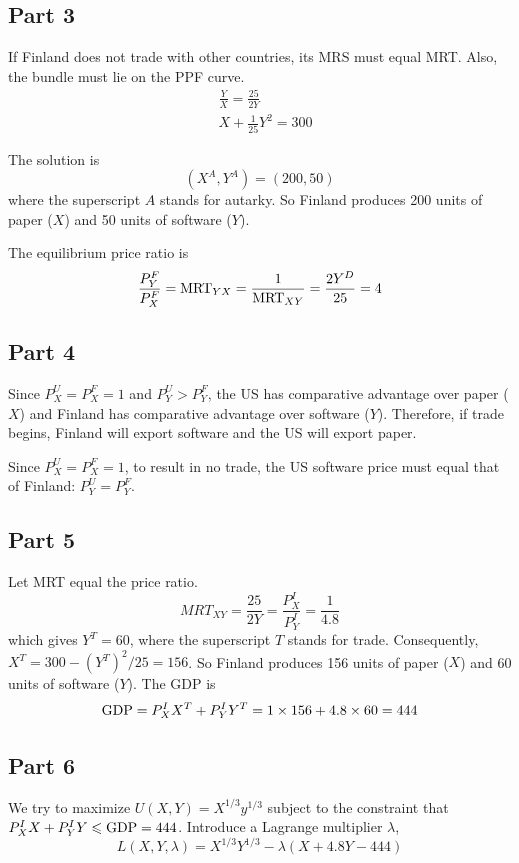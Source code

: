 \documentclass{article}
\begin{document}
\subsection{Part 3}
If Finland does not trade with other countries, its MRS must equal MRT. Also, the bundle must lie on the PPF curve.
\begin{align*}
&\frac{Y}{X}=\frac{25}{2Y}\\
&X+\frac{1}{25}Y^2=300
\end{align*}

The solution is
\begin{equation*}
(X^A,Y^A)=(200,50)
\end{equation*}
where the superscript $A$ stands for autarky. So Finland produces 200 units of paper ($X$) and 50 units of software ($Y$).

The equilibrium price ratio is
\begin{equation*}
\frac{P^F_Y}{P^F_X}=\textup{MRT}_{YX}=\frac{1}{\textup{MRT}_{XY}}=\frac{2Y^D}{25}=4
\end{equation*}

\subsection{Part 4}
Since $P^U_X=P^F_X=1$ and $P^U_Y>P^F_Y$, the US has comparative advantage over paper ($X$) and Finland has comparative advantage over software ($Y$). Therefore, if trade begins, Finland will export software and the US will export paper.

Since $P^U_X=P^F_X=1$, to result in no trade, the US software price must equal that of Finland: $P^U_Y=P^F_Y$.

\subsection{Part 5}
Let MRT equal the price ratio.
\begin{equation*}
MRT_{XY}=\frac{25}{2Y}=\frac{P_X^I}{P_Y^I}=\frac{1}{4.8}
\end{equation*}
which gives $Y^T=60$, where the superscript $T$ stands for trade. Consequently, $X^T=300-(Y^T)^2/25=156$. So Finland produces 156 units of paper ($X$) and 60 units of software ($Y$). The GDP is
\begin{equation*}
\textup{GDP}=P_X^IX^T+P_Y^IY^T=1\times 156+4.8\times 60=444
\end{equation*}

\subsection{Part 6}
We try to maximize $U(X,Y)=X^{1/3}y^{1/3}$ subject to the constraint that $P_X^IX+P_Y^IY\leqslant\textup{GDP}=444$. Introduce a Lagrange multiplier $\lambda$,
\begin{equation*}
L(X,Y,\lambda)=X^{1/3}Y^{1/3}-\lambda(X+4.8Y-444)
\end{equation*}
\end{document}
